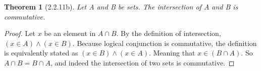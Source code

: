 \documentclass[a4paper, 12pt]{article}
\theoremstyle{plain}
\newtheorem*{theorem*}{Theorem}
\begin{document}
	
	\begin{theorem*}[2.2.11b]
		Let A and B be sets. The intersection of A and B is commutative.
	\end{theorem*}
	
	\begin{proof}
		Let $x$ be an element in $A \cap B$. By the definition of intersection, $(x \in A) \land (x \in B)$. 
		Because logical conjunction is commutative, the definition is equivalently stated as 
		$(x \in B) \land (x \in A)$. Meaning that $x \in (B \cap A)$. So $A \cap B = B \cap A$, and indeed 
		the intersection of two sets is commutative.
	\end{proof}
\end{document}
